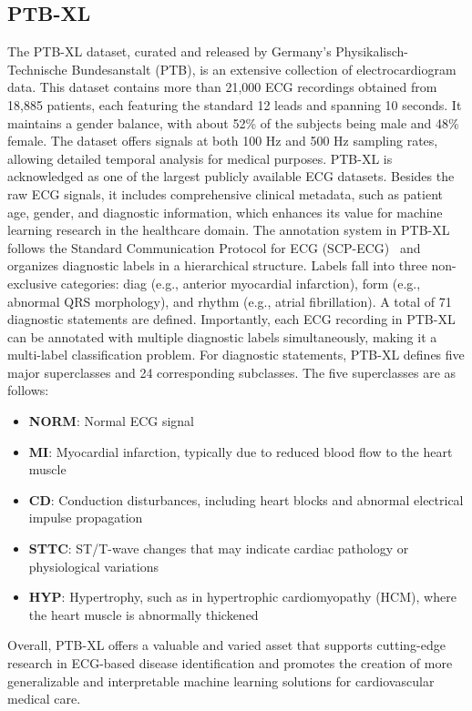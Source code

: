 \documentclass[a4paper,fleqn]{cas-dc}
\begin{document}
\subsection{PTB-XL}
The PTB-XL dataset, curated and released by Germany's Physikalisch-Technische Bundesanstalt (PTB), is an extensive collection of electrocardiogram data. This dataset contains more than 21,000 ECG recordings obtained from 18,885 patients, each featuring the standard 12 leads and spanning 10 seconds. It maintains a gender balance, with about 52\% of the subjects being male and 48\% female. The dataset offers signals at both 100 Hz and 500 Hz sampling rates, allowing detailed temporal analysis for medical purposes. PTB-XL is acknowledged as one of the largest publicly available ECG datasets. Besides the raw ECG signals, it includes comprehensive clinical metadata, such as patient age, gender, and diagnostic information, which enhances its value for machine learning research in the healthcare domain. The annotation system in PTB-XL follows the Standard Communication Protocol for ECG (SCP-ECG)~\cite{iso2009} and organizes diagnostic labels in a hierarchical structure. Labels fall into three non-exclusive categories: diag (e.g., anterior myocardial infarction), form (e.g., abnormal QRS morphology), and rhythm (e.g., atrial fibrillation). A total of 71 diagnostic statements are defined. Importantly, each ECG recording in PTB-XL can be annotated with multiple diagnostic labels simultaneously, making it a multi-label classification problem. For diagnostic statements, PTB-XL defines five major superclasses and 24 corresponding subclasses. The five superclasses are as follows:
\begin{itemize}
    \item \textbf{NORM}: Normal ECG signal
    \item \textbf{MI}: Myocardial infarction, typically due to reduced blood flow to the heart muscle
    \item \textbf{CD}: Conduction disturbances, including heart blocks and abnormal electrical impulse propagation
    \item \textbf{STTC}: ST/T-wave changes that may indicate cardiac pathology or physiological variations
    \item \textbf{HYP}: Hypertrophy, such as in hypertrophic cardiomyopathy (HCM), where the heart muscle is abnormally thickened
\end{itemize}

Overall, PTB-XL offers a valuable and varied asset that supports cutting-edge research in ECG-based disease identification and promotes the creation of more generalizable and interpretable machine learning solutions for cardiovascular medical care.
\end{document}
